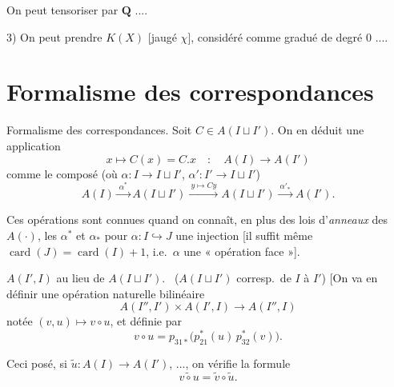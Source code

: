 \documentclass[11pt,a4paper]{article}
\begin{document}
On peut tensoriser par $\mathbf{Q}$ ....

3) On peut prendre $K(X)$ [jaugé  $\chi$], considéré comme
gradué de degré $0$ ....

\section*{Formalisme des correspondances}

Formalisme des correspondances. Soit $C \in A(I \sqcup I')$. On en déduit une
application
\[
  x \longmapsto C(x) = C.x \quad : \quad A(I) \to A(I')
\]
comme le composé (où $\alpha : I \to I \sqcup I'$, $\alpha' : I' \to I \sqcup I'$)
\[
  A(I) \xrightarrow{\ \alpha^{*}\ } A(I \sqcup I') \xrightarrow{\ y \mapsto Cy\ }
  A(I \sqcup I') \xrightarrow{\ \alpha'_{*}\ } A(I') .
\]

Ces opérations sont connues quand on connaît, en plus des lois
d'\emph{anneaux} des $A(\cdot)$, les $\alpha^{*}$ et $\alpha_{*}$ pour
$\alpha : I \hookrightarrow J$ une injection [il suffit même
$\operatorname{card}(J) = \operatorname{card}(I) + 1$, i.e.\ $\alpha$ une
« opération face »].


 $A(I', I)$ au lieu de $A(I \sqcup I')$.
\ ($A(I \sqcup I')$ \struck{\ill{}} corresp.\ de $I$ à $I'$)
[On va en définir une opération naturelle bilinéaire
\[
  A(I'', I') \times A(I', I) \longrightarrow A(I'', I)
\]
notée $(v, u) \longmapsto v \circ u$, et définie par
\[
  v \circ u = p_{31*}\bigl(p_{21}^{*}(u)\, p_{32}^{*}(v)\bigr) .
\]


Ceci posé, si $\widetilde{u} : A(I) \to A(I')$, \struck{\ill{}} ..., on
vérifie la formule
\[
  \widetilde{v \circ u} = \widetilde{v} \circ \widetilde{u} .
\]

\end{document}
